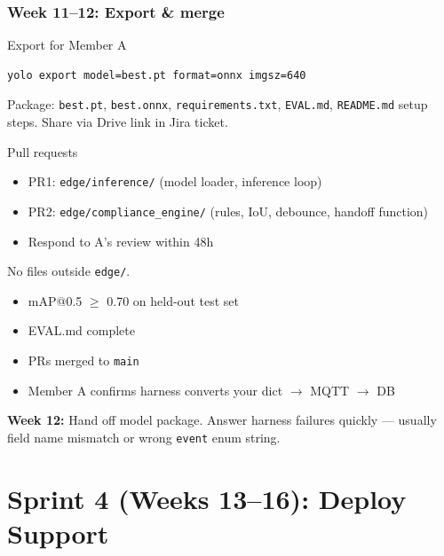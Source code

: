 \documentclass[12pt,a4paper]{report}
\begin{document}
\subsection{Week 11--12: Export \& merge}

\begin{stepbox}{Export for Member A}
\begin{verbatim}
yolo export model=best.pt format=onnx imgsz=640
\end{verbatim}
Package: \texttt{best.pt}, \texttt{best.onnx}, \texttt{requirements.txt}, \texttt{EVAL.md}, \texttt{README.md} setup steps. Share via Drive link in Jira ticket.
\end{stepbox}

\begin{stepbox}{Pull requests}
\begin{itemize}
    \item PR1: \texttt{edge/inference/} (model loader, inference loop)
    \item PR2: \texttt{edge/compliance\_engine/} (rules, IoU, debounce, handoff function)
    \item Respond to A's review within 48h
\end{itemize}
No files outside \texttt{edge/}.
\end{stepbox}

\begin{verifybox}
\begin{itemize}
    \item[$\square$] mAP@0.5 $\geq$ 0.70 on held-out test set
    \item[$\square$] EVAL.md complete
    \item[$\square$] PRs merged to \texttt{main}
    \item[$\square$] Member A confirms harness converts your dict $\rightarrow$ MQTT $\rightarrow$ DB
\end{itemize}
\end{verifybox}

\begin{collabbox}
\textbf{Week 12:} Hand off model package. Answer harness failures quickly --- usually field name mismatch or wrong \texttt{event} enum string.
\end{collabbox}

\chapter{Sprint 4 (Weeks 13--16): Deploy Support}
\end{document}
